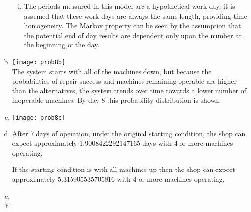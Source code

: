 \documentclass[answers]{exam}
\begin{document}
\begin{questions}
\begin{solution}
\begin{enumerate}[(a)]
\begin{enumerate}[i.]
			\item 
			The periods measured in this model are a hypothetical work day, 
			it is assumed that these work days are always the same length,
			providing time homogeneity.
			The Markov property can be seen by the assumption that the potential end of day results
			are dependent only upon the number at the beginning of the day.
		\end{enumerate}
	
		\item 
		\texttt{[image: prob8b]} \\	
		The system starts with all of the machines down,
		but because the probabilities of repair success and machines remaining operable are higher than the alternatives,
		the system trends over time towards a lower number of inoperable machines.
		By day 8 this probability distribution is shown.
		
		\item 
		\texttt{[image: prob8c]}
		
		\item 
		After 7 days of operation, under the original starting condition, the shop can expect 
		approximately 1.9008422292147165 days with 4 or more machines operating.
		
		If the starting condition is with all machines up then the shop can expect
		approximately 5.315905535705816  with 4 or more machines operating.
		
		\item 

		\item 
	\end{enumerate}
\end{solution}



\end{questions}
\end{document}
